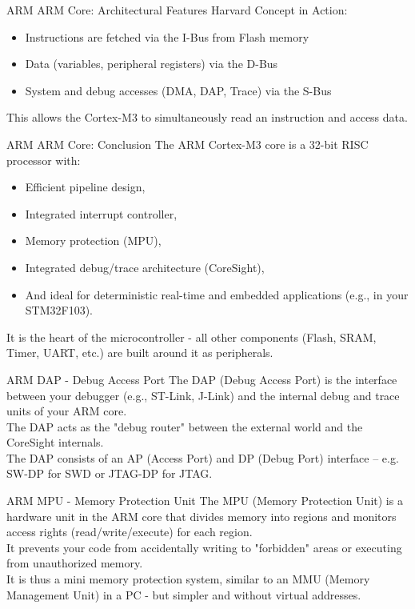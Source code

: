\documentclass{beamer}
\begin{document}
\begin{frame}{ARM}
	{ARM Core: Architectural Features}
	Harvard Concept in Action:
	\begin{itemize}
		\item Instructions are fetched via the I-Bus from Flash memory
		\item Data (variables, peripheral registers) via the D-Bus
		\item System and debug accesses (DMA, DAP, Trace) via the S-Bus
	\end{itemize}
	This allows the Cortex-M3 to simultaneously read an instruction and access data.
\end{frame}
\begin{frame}{ARM}
	{ARM Core: Conclusion}
	The ARM Cortex-M3 core is a 32-bit RISC processor with:
	\begin{itemize}
		\item Efficient pipeline design,
		\item Integrated interrupt controller,
		\item Memory protection (MPU),
		\item Integrated debug/trace architecture (CoreSight),
		\item And ideal for deterministic real-time and embedded applications (e.g., in your STM32F103).
	\end{itemize}
	It is the heart of the microcontroller - all other components (Flash, SRAM, Timer, UART, etc.) are built around it as peripherals.
\end{frame}
\begin{frame}{ARM}
	{DAP - Debug Access Port}
	The DAP (Debug Access Port) is the interface between your debugger (e.g., ST-Link, J-Link) and the internal debug and trace units of your ARM core.\\
	\vspace{0.2cm}
	The DAP acts as the "debug router" between the external world and the CoreSight internals.\\
	\vspace{0.2cm}
	The DAP consists of an AP (Access Port) and DP (Debug Port) interface – e.g. SW-DP for SWD or JTAG-DP for JTAG.
\end{frame}
\begin{frame}{ARM}
	{MPU - Memory Protection Unit}
	The MPU (Memory Protection Unit) is a hardware unit in the ARM core that divides memory into regions and monitors access rights (read/write/execute) for each region.\\
	\vspace{0.2cm}
	It prevents your code from accidentally writing to "forbidden" areas or executing from unauthorized memory.\\
	\vspace{0.2cm}
	It is thus a mini memory protection system, similar to an MMU (Memory Management Unit) in a PC - but simpler and without virtual addresses.
\end{frame}
\end{document}
